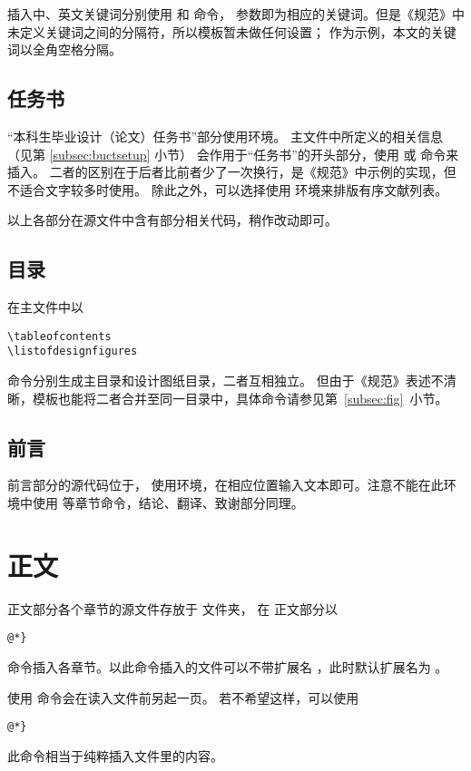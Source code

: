 插入中、英文关键词分别使用  和 命令，
参数即为相应的关键词。但是《规范》中未定义关键词之间的分隔符，所以模板暂未做任何设置；
作为示例，本文的关键词以全角空格分隔。

\subsection{任务书}\label{subsec:taskbook}
“本科生毕业设计（论文）任务书”部分使用环境。
主文件中所定义的相关信息（见第 \ref{subsec:buctsetup} 小节）
会作用于“任务书”的开头部分，使用  或  命令来插入。
二者的区别在于后者比前者少了一次换行，是《规范》中示例的实现，但不适合文字较多时使用。
除此之外，可以选择使用  环境来排版有序文献列表。

以上各部分在源文件中含有部分相关代码，稍作改动即可。

\subsection{目录}\label{subsec:content}
在主文件中以
\begin{lstlisting}[numbers=none]
\tableofcontents
\listofdesignfigures
\end{lstlisting}
命令分别生成主目录和设计图纸目录，二者互相独立。
但由于《规范》表述不清晰，模板也能将二者合并至同一目录中，具体命令请参见第~\ref{subsec:fig}~小节。

\subsection{前言}\label{subsec:foreword}
前言部分的源代码位于，
使用环境，在相应位置输入文本即可。注意不能在此环境中使用
等章节命令，结论、翻译、致谢部分同理。

\section{正文}
正文部分各个章节的源文件存放于  文件夹，
在  正文部分以

\begin{lstlisting}[numbers=none]
@*}
	\end{lstlisting}
命令插入各章节。以此命令插入的文件可以不带扩展名
，此时默认扩展名为 。

使用  命令会在读入文件前另起一页。
若不希望这样，可以使用
\begin{lstlisting}[numbers=none]
@*}
	\end{lstlisting}
此命令相当于纯粹插入文件里的内容。


